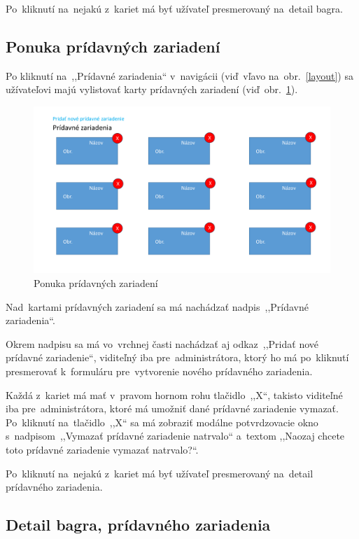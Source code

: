 Po~kliknutí na~nejakú z~kariet má byť užívateľ presmerovaný na~detail bagra.

\subsection{Ponuka prídavných zariadení}

Po kliknutí na~,,Prídavné zariadenia`` v~navigácii (viď~vľavo na~obr.~\ref{layout}) sa užívateľovi majú vylistovať karty prídavných zariadení (viď~obr.~\ref{additional equipment cards}).

\begin{figure}[H]\centering
\includegraphics[width=140mm]{../img/UI concept/additional equipment cards}
\caption{Ponuka prídavných zariadení}
\label{additional equipment cards}
\end{figure}

Nad~kartami prídavných zariadení sa má nachádzať nadpis~,,Prídavné zariadenia``.

Okrem nadpisu sa má vo~vrchnej časti nachádzať aj odkaz~,,Pridať nové prídavné zariadenie``, viditeľný iba pre~administrátora, ktorý ho má  po~kliknutí presmerovať k~formuláru pre~vytvorenie nového prídavného zariadenia.

Každá z~kariet má mať v~pravom hornom rohu tlačidlo~,,X``, takisto viditeľné iba pre~administrátora, ktoré má umožniť dané prídavné zariadenie vymazať. Po~kliknutí na~tlačidlo~,,X`` sa má zobraziť modálne potvrdzovacie okno s~nadpisom~,,Vymazať prídavné zariadenie natrvalo`` a~textom ,,Naozaj chcete toto prídavné zariadenie vymazať natrvalo?``.

Po~kliknutí na~nejakú z~kariet má byť užívateľ presmerovaný na~detail prídavného zariadenia.

\subsection{Detail bagra, prídavného zariadenia}

